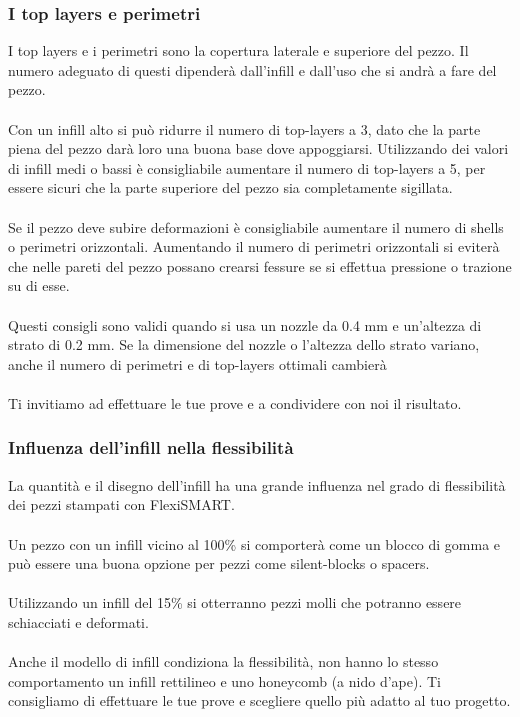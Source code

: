\documentclass[11pt,a4paper]{article}
\begin{document}
		\subsubsection{I top layers e perimetri}
I top layers e i perimetri sono la copertura laterale e superiore del pezzo. Il numero adeguato di questi dipenderà dall'infill e dall'uso che si andrà a fare del pezzo.
\\\\
Con un infill alto si può ridurre il numero di top-layers a 3, dato che la parte piena del pezzo darà loro una buona base dove appoggiarsi. Utilizzando dei valori di infill medi o bassi è consigliabile aumentare il numero di top-layers a 5, per essere sicuri che la parte superiore del pezzo sia completamente sigillata.
\\\\
Se il pezzo deve subire deformazioni è consigliabile aumentare il numero di shells o perimetri orizzontali. Aumentando il numero di perimetri orizzontali si eviterà che nelle pareti del pezzo possano crearsi fessure se si effettua pressione o trazione su di esse. 
\\\\
Questi consigli sono validi quando si usa un nozzle da 0.4 mm e un'altezza di strato di 0.2 mm. Se la dimensione del nozzle o l'altezza dello strato variano, anche il numero di perimetri e di top-layers ottimali cambierà
\\\\
Ti invitiamo ad effettuare le tue prove e a condividere con noi il risultato. 
		\subsubsection{Influenza dell'infill nella flessibilità}
La quantità e il disegno dell'infill ha una grande influenza nel grado di flessibilità dei pezzi stampati con FlexiSMART.
\\\\
Un pezzo con un infill vicino al 100\% si comporterà come un blocco di gomma e può essere una buona opzione per pezzi come silent-blocks o spacers.
\\\\
Utilizzando un infill del 15\% si otterranno pezzi molli che potranno essere schiacciati e deformati.
\\\\
Anche il modello di infill condiziona la flessibilità, non hanno lo stesso comportamento un infill rettilineo e uno honeycomb (a nido d'ape). Ti consigliamo di effettuare le tue prove e scegliere quello più adatto al tuo progetto.
\end{document}
